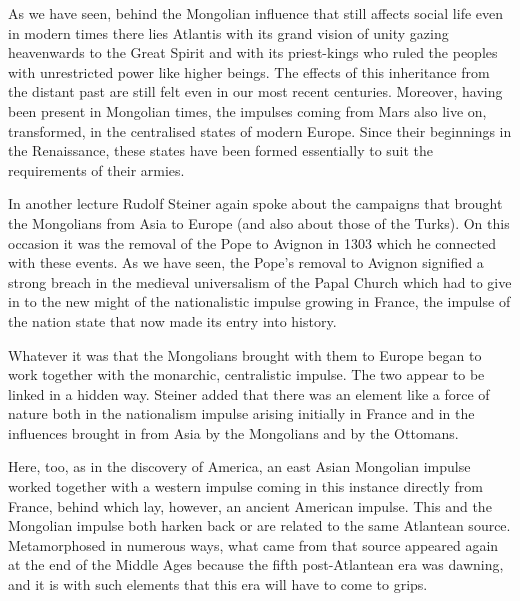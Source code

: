 As we have seen, behind the Mongolian influence that still affects social life even in modern times there lies Atlantis with its grand vision of unity gazing heavenwards to the Great Spirit and with its priest-kings who ruled the peoples with unrestricted power like higher beings. The effects of this inheritance from the distant past are still felt even in our most recent centuries. Moreover, having been present in Mongolian times, the impulses coming from Mars also live on, transformed, in the centralised states of modern Europe. Since their beginnings in the Renaissance, these states have been formed essentially to suit the requirements of their armies.

In another lecture Rudolf Steiner again spoke about the campaigns that brought the Mongolians from Asia to Europe (and also about those of the Turks). On this occasion it was the removal of the Pope to Avignon in 1303 which he connected with these events. As we have seen, the Pope's removal to Avignon signified a strong breach in the medieval universalism of the Papal Church which had to give in to the new might of the nationalistic impulse growing in France, the impulse of the nation state that now made its entry into history.

Whatever it was that the Mongolians brought with them to Europe began to work together with the monarchic, centralistic impulse. The two appear to be linked in a hidden way. Steiner added that there was an element like a force of nature both in the nationalism impulse arising initially in France and in the influences brought in from Asia by the Mongolians and by the Ottomans.

Here, too, as in the discovery of America, an east Asian Mongolian impulse worked together with a western impulse coming in this instance directly from France, behind which lay, however, an ancient American impulse. This and the Mongolian impulse both harken back or are related to the same Atlantean source. Metamorphosed in numerous ways, what came from that source appeared again at the end of the Middle Ages because the fifth post-Atlantean era was dawning, and it is with such elements that this era will have to come to grips.



